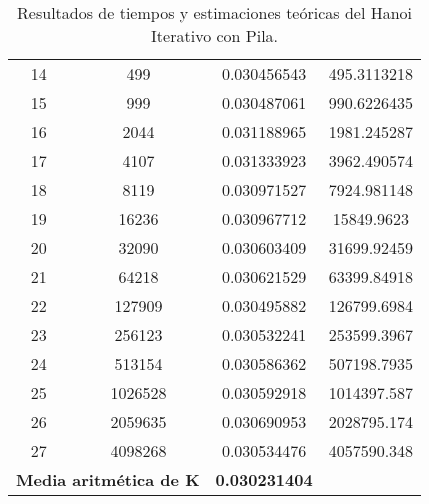\documentclass[a4paper,12pt]{article} %
\begin{document}
\begin{table}[H]
{\begin{tabular}{|c|c|c|c|}
			14                                                 & 499                  & 0.030456543              & 495.3113218                                          \\
			15                                                 & 999                  & 0.030487061              & 990.6226435                                          \\
			16                                                 & 2044                 & 0.031188965              & 1981.245287                                          \\
			17                                                 & 4107                 & 0.031333923              & 3962.490574                                          \\
			18                                                 & 8119                 & 0.030971527              & 7924.981148                                          \\
			19                                                 & 16236                & 0.030967712              & 15849.9623                                           \\
			20                                                 & 32090                & 0.030603409              & 31699.92459                                          \\
			21                                                 & 64218                & 0.030621529              & 63399.84918                                          \\
			22                                                 & 127909               & 0.030495882              & 126799.6984                                          \\
			23                                                 & 256123               & 0.030532241              & 253599.3967                                          \\
			24                                                 & 513154               & 0.030586362              & 507198.7935                                          \\
			25                                                 & 1026528              & 0.030592918              & 1014397.587                                          \\
			26                                                 & 2059635              & 0.030690953              & 2028795.174                                          \\
			27                                                 & 4098268              & 0.030534476              & 4057590.348                                          \\
			\hline
			\multicolumn{2}{l}{\textbf{Media aritmética de K}} & \textbf{0.030231404}                                                                                   \\
			\hline
		\end{tabular}
	}
	\caption{Resultados de tiempos y estimaciones teóricas del Hanoi Iterativo con Pila.}
	\label{tab:tiempos}
\end{table}
\end{document}
